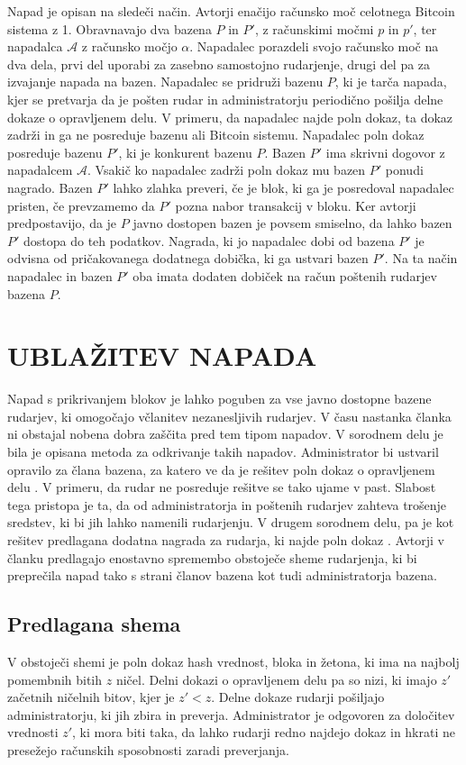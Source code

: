 \documentclass{acm_proc_article-sp}
\begin{document}
Napad je opisan na sledeči način. Avtorji enačijo računsko moč celotnega Bitcoin sistema z 1. Obravnavajo dva bazena $P$ in $P'$, z računskimi močmi $p$ in $p'$, ter napadalca $\mathcal{A}$ z računsko močjo $\alpha$. Napadalec porazdeli svojo računsko moč na dva dela, prvi del uporabi za zasebno samostojno rudarjenje, drugi del pa za izvajanje napada na bazen. Napadalec se pridruži bazenu $P$, ki je tarča napada, kjer se pretvarja da je pošten rudar in administratorju periodično pošilja delne dokaze o opravljenem delu. V primeru, da napadalec najde poln dokaz, ta dokaz zadrži in ga ne posreduje bazenu ali Bitcoin sistemu.
Napadalec poln dokaz posreduje bazenu $P'$, ki je konkurent bazenu $P$. Bazen $P'$ ima skrivni dogovor z napadalcem $\mathcal{A}$. Vsakič ko napadalec zadrži poln dokaz mu bazen $P'$ ponudi nagrado. Bazen $P'$ lahko zlahka preveri, če je blok, ki ga je posredoval napadalec pristen, če prevzamemo da $P'$ pozna nabor transakcij v bloku. Ker avtorji predpostavijo, da je $P$ javno dostopen bazen je povsem smiselno, da lahko bazen $P'$ dostopa do teh podatkov. Nagrada, ki jo napadalec dobi od bazena $P'$ je odvisna od pričakovanega dodatnega dobička, ki ga ustvari bazen $P'$. Na ta način napadalec in bazen $P'$ oba imata dodaten dobiček na račun poštenih rudarjev bazena $P$. 


\section{UBLAŽITEV NAPADA} \label{sekcija3}
Napad s prikrivanjem blokov je lahko poguben za vse javno dostopne bazene rudarjev, ki omogočajo včlanitev nezanesljivih rudarjev. V času nastanka članka ni obstajal nobena dobra zaščita pred tem tipom napadov. V sorodnem delu je bila je opisana metoda za odkrivanje takih napadov. Administrator bi ustvaril opravilo za člana bazena, za katero ve da je rešitev poln dokaz o opravljenem delu \cite{analysisofbitcoin}. V primeru, da rudar ne posreduje rešitve se tako ujame v past. Slabost tega pristopa je ta, da od administratorja in poštenih rudarjev zahteva trošenje sredstev, ki bi jih lahko namenili rudarjenju. V drugem sorodnem delu, pa je kot rešitev predlagana dodatna nagrada za rudarja, ki najde poln dokaz \cite{noteonblockattack}.
Avtorji v članku predlagajo enostavno spremembo obstoječe sheme rudarjenja, ki  bi preprečila napad tako s strani članov bazena kot tudi administratorja bazena.


\subsection{Predlagana shema}
V obstoječi shemi je poln dokaz hash vrednost, bloka in žetona, ki ima na najbolj pomembnih bitih $z$ ničel. Delni dokazi o opravljenem delu pa so nizi, ki imajo $z'$ začetnih ničelnih bitov, kjer je $z' < z$.
Delne dokaze rudarji pošiljajo administratorju, ki jih zbira in preverja. Administrator je odgovoren za določitev vrednosti $z'$, ki mora biti taka, da lahko rudarji redno najdejo dokaz in hkrati ne presežejo računskih sposobnosti zaradi preverjanja.
 
\end{document}
